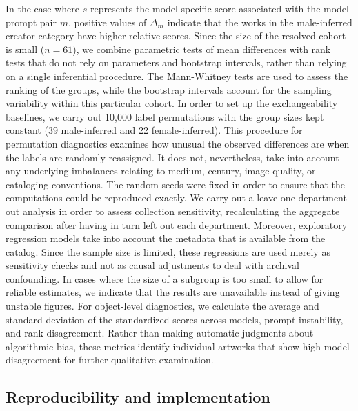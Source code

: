 \documentclass[pdflatex,sn-basic,Numbered]{sn-jnl}
\begin{document}
In the case where $s$ represents the model-specific score associated with the model-prompt pair $m$, positive values of $\Delta_m$ indicate that the works in the male-inferred creator category have higher relative scores. Since the size of the resolved cohort is small ($n=61$), we combine parametric tests of mean differences with rank tests that do not rely on parameters and bootstrap intervals, rather than relying on a single inferential procedure. The Mann-Whitney tests are used to assess the ranking of the groups, while the bootstrap intervals account for the sampling variability within this particular cohort.
In order to set up the exchangeability baselines, we carry out 10,000 label permutations with the group sizes kept constant (39 male-inferred and 22 female-inferred). This procedure for permutation diagnostics examines how unusual the observed differences are when the labels are randomly reassigned. It does not, nevertheless, take into account any underlying imbalances relating to medium, century, image quality, or cataloging conventions. The random seeds were fixed in order to ensure that the computations could be reproduced exactly.
We carry out a leave-one-department-out analysis in order to assess collection sensitivity, recalculating the aggregate comparison after having in turn left out each department. Moreover, exploratory regression models take into account the metadata that is available from the catalog. Since the sample size is limited, these regressions are used merely as sensitivity checks and not as causal adjustments to deal with archival confounding. In cases where the size of a subgroup is too small to allow for reliable estimates, we indicate that the results are unavailable instead of giving unstable figures.
For object-level diagnostics, we calculate the average and standard deviation of the standardized scores across models, prompt instability, and rank disagreement. Rather than making automatic judgments about algorithmic bias, these metrics identify individual artworks that show high model disagreement for further qualitative examination.

\subsection{Reproducibility and implementation}
\end{document}
